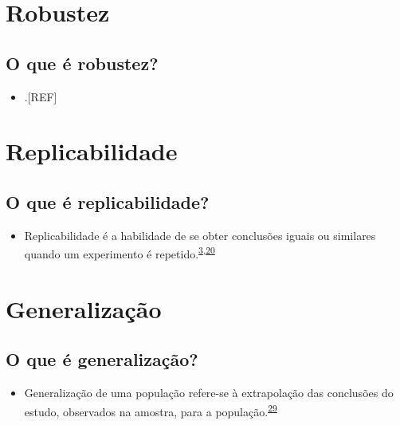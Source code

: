 \documentclass[
  a4paper,
]{book}
\providecommand{\tightlist}{%
  \setlength{\itemsep}{0pt}\setlength{\parskip}{0pt}}
\begin{document}
\hypertarget{robustez}{%
\section{Robustez}\label{robustez}}

\hypertarget{o-que-uxe9-robustez}{%
\subsection{O que é robustez?}\label{o-que-uxe9-robustez}}

\begin{itemize}
\tightlist
\item
  .{[}REF{]}
\end{itemize}

\hypertarget{replicabilidade}{%
\section{Replicabilidade}\label{replicabilidade}}

\hypertarget{o-que-uxe9-replicabilidade}{%
\subsection{O que é replicabilidade?}\label{o-que-uxe9-replicabilidade}}

\begin{itemize}
\tightlist
\item
  Replicabilidade é a habilidade de se obter conclusões iguais ou similares quando um experimento é repetido.\textsuperscript{\protect\hyperlink{ref-mair2016}{3},\protect\hyperlink{ref-hofner2015}{20}}
\end{itemize}

\hypertarget{generalizauxe7uxe3o}{%
\section{Generalização}\label{generalizauxe7uxe3o}}

\hypertarget{o-que-uxe9-generalizauxe7uxe3o}{%
\subsection{O que é generalização?}\label{o-que-uxe9-generalizauxe7uxe3o}}

\begin{itemize}
\tightlist
\item
  Generalização de uma população refere-se à extrapolação das conclusões do estudo, observados na amostra, para a população.\textsuperscript{\protect\hyperlink{ref-Banerjee2010}{29}}
\end{itemize}
\end{document}
